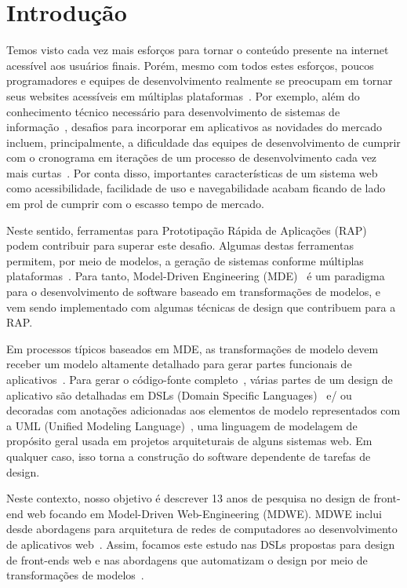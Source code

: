 
\section{Introdução}
Temos visto cada vez mais esforços para tornar o conteúdo presente na internet acessível aos usuários finais. Porém, mesmo com todos estes esforços, poucos programadores e equipes de desenvolvimento realmente se preocupam em tornar seus websites acessíveis em múltiplas plataformas~\cite{Brambilla14,Rivero2017}. Por exemplo, além do conhecimento técnico necessário para desenvolvimento de sistemas de informação~\cite{Basso16JSS}, desafios para incorporar em aplicativos as novidades do mercado incluem, principalmente, a dificuldade das equipes de desenvolvimento de cumprir com o cronograma em iterações de um processo de desenvolvimento cada vez mais curtas~\cite{OLIVEIRA201886}. Por conta disso, importantes características de um sistema web como acessibilidade, facilidade de uso e navegabilidade acabam ficando de lado em prol de cumprir com o escasso tempo de mercado. 

Neste sentido, ferramentas para Prototipação Rápida de Aplicações (RAP)~\cite {Elkoutbi06, Planas09} podem contribuir para superar este desafio. Algumas destas ferramentas permitem, por meio de modelos, a geração de sistemas conforme múltiplas plataformas~\cite{Vara12}. Para tanto, Model-Driven Engineering (MDE)~\cite{Kent02} é um paradigma para o desenvolvimento de software baseado em transformações de modelos, e vem sendo implementado com algumas técnicas de design que contribuem para a RAP. 

Em processos típicos baseados em MDE, as transformações de modelo devem receber um modelo altamente detalhado para gerar partes funcionais de aplicativos~\cite {Schmidt06}. Para gerar o código-fonte completo~\cite{Kelly08}, várias partes de um design de aplicativo são detalhadas em DSLs (Domain Specific Languages)~\cite{Voelter09} e/ ou decoradas com anotações adicionadas aos elementos de modelo representados com a UML (Unified Modeling Language)~\cite{Elkoutbi06}, uma linguagem de modelagem de propósito geral usada em projetos arquiteturais de alguns sistemas web. Em qualquer caso, isso torna a construção do software dependente de tarefas de design.

Neste contexto, nosso objetivo é descrever 13 anos de pesquisa no design de front-end web focando em Model-Driven Web-Engineering (MDWE). MDWE inclui desde abordagens para arquitetura de redes de computadores ao desenvolvimento de aplicativos web~\cite{Brambilla14}. Assim, focamos este estudo nas DSLs propostas para design de front-ends web e nas abordagens que automatizam o design por meio de transformações de modelos~\cite{Batory13MODELS}. 

